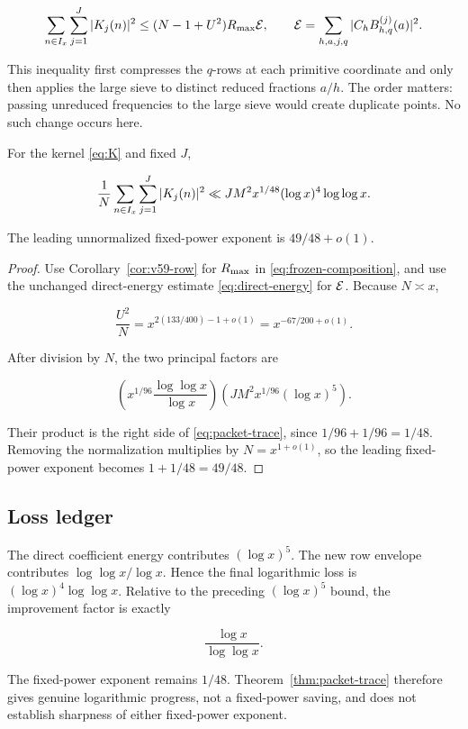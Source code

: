 \begin{equation}
 \sum_{n\in I_x}\sum_{j=1}^{J}|K_j(n)|^2
 \leq (N-1+U^2)R_{\max}\mathcal E,
 \qquad
 \mathcal E=\sum_{h,a,j,q}|C_hB_{h,q}^{(j)}(a)|^2.
 \label{eq:frozen-composition}
\end{equation}

This inequality first compresses the $q$-rows at each primitive coordinate
and only then applies the large sieve to distinct reduced fractions $a/h$.
The order matters: passing unreduced frequencies to the large sieve would
create duplicate points.  No such change occurs here.

\begin{theorem}
\label{thm:packet-trace}
For the kernel \eqref{eq:K} and fixed $J$,

\begin{equation}
 \frac1N\sum_{n\in I_x}\sum_{j=1}^{J}|K_j(n)|^2
 \ll JM^2x^{1/48}(\log x)^4\log\log x.
 \label{eq:packet-trace}
\end{equation}

The leading unnormalized fixed-power exponent is $49/48+o(1)$.
\end{theorem}

\begin{proof}
Use Corollary~\ref{cor:v59-row} for $R_{\max}$ in
\eqref{eq:frozen-composition}, and use the unchanged direct-energy estimate
\eqref{eq:direct-energy} for $\mathcal E$.  Because $N\asymp x$,

\begin{equation}
 \frac{U^2}{N}
 =x^{2(133/400)-1+o(1)}
 =x^{-67/200+o(1)}.
 \label{eq:window-correction}
\end{equation}

After division by $N$, the two principal factors are

\[
 \left(x^{1/96}\frac{\log\log x}{\log x}\right)
 \left(JM^2x^{1/96}(\log x)^5\right).
\]

Their product is the right side of \eqref{eq:packet-trace}, since
$1/96+1/96=1/48$.  Removing the normalization multiplies by
$N=x^{1+o(1)}$, so the leading fixed-power exponent becomes
$1+1/48=49/48$.
\end{proof}

\subsection{Loss ledger}

The direct coefficient energy contributes $(\log x)^5$.  The new row
envelope contributes $\log\log x/\log x$.  Hence the final logarithmic loss
is $(\log x)^4\log\log x$.  Relative to the preceding
$(\log x)^5$ bound, the improvement factor is exactly

\[
 \frac{\log x}{\log\log x}.
\]

The fixed-power exponent remains $1/48$.  Theorem~\ref{thm:packet-trace}
therefore gives genuine logarithmic progress, not a fixed-power saving, and
does not establish sharpness of either fixed-power exponent.
